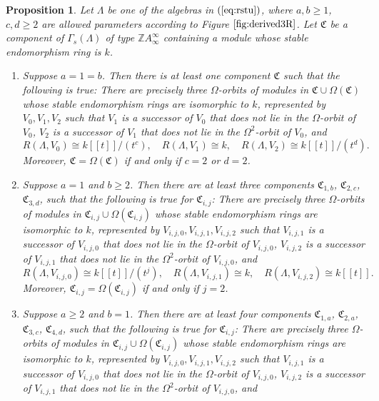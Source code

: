\documentclass{amsart}
\theoremstyle{plain}
\newtheorem{prop}[thm]{Proposition}
\theoremstyle{definition}
\theoremstyle{remark}
\begin{document}
\begin{prop}
\label{prop:derivedexvelez}
Let $\Lambda$ be one of the algebras in $(\ref{eq:rstu})$, where $a,b\ge 1$, $c,d\ge 2$ are allowed parameters according to Figure 
$\ref{fig:derived3R}$. Let $\mathfrak{C}$ be a component of $\Gamma_s(\Lambda)$ of type $\mathbb{Z}A_\infty^\infty$ 
containing a module whose stable endomorphism ring is $k$.
\begin{enumerate}
\item[(i)] Suppose $a=1=b$. Then there is at least one component $\mathfrak{C}$ such that the following is true:
There are precisely three $\Omega$-orbits of modules in $\mathfrak{C}\cup\Omega(\mathfrak{C})$ whose stable endomorphism rings are 
isomorphic to $k$, represented by  $V_0,V_1,V_2$ such that $V_1$ is a successor of $V_0$ that does not lie in the $\Omega$-orbit of $V_0$, 
$V_2$ is a successor of $V_1$ that does not lie in the $\Omega^2$-orbit of $V_0$, and
$$R(\Lambda,V_0)\cong k[[t]]/(t^c), \quad R(\Lambda,V_1)\cong k, \quad R(\Lambda,V_2)\cong k[[t]]/(t^d).$$
Moreover, $\mathfrak{C}=\Omega(\mathfrak{C})$ if and only if $c=2$ or $d=2$.
\item[(ii)] Suppose $a=1$ and $b\ge 2$. Then there are at least three components 
$\mathfrak{C}_{1,b}$, $\mathfrak{C}_{2,c}$, $\mathfrak{C}_{3,d}$,
such that the following is true for $\mathfrak{C}_{i,j}$:
There are precisely three $\Omega$-orbits of modules in $\mathfrak{C}_{i,j}\cup\Omega(\mathfrak{C}_{i,j})$ whose stable endomorphism rings 
are isomorphic to $k$, represented by $V_{i,j,0},V_{i,j,1},V_{i,j,2}$ such that $V_{i,j,1}$ is a successor of $V_{i,j,0}$ that does not lie in the 
$\Omega$-orbit of $V_{i,j,0}$, $V_{i,j,2}$ is a successor of $V_{i,j,1}$ that does not lie in the $\Omega^2$-orbit of $V_{i,j,0}$, and
$$R(\Lambda,V_{i,j,0})\cong k[[t]]/(t^j), \quad R(\Lambda,V_{i,j,1})\cong k, \quad R(\Lambda,V_{i,j,2})\cong k[[t]].$$
Moreover, $\mathfrak{C}_{i,j}=\Omega(\mathfrak{C}_{i,j})$ if and only if $j=2$.
\item[(iii)] Suppose $a\ge 2$ and $b=1$. Then there are at least four components 
$\mathfrak{C}_{1,a}$, $\mathfrak{C}_{2,a}$, $\mathfrak{C}_{3,c}$, $\mathfrak{C}_{4,d}$,
such that the following is true for $\mathfrak{C}_{i,j}$:
There are precisely three $\Omega$-orbits of modules in $\mathfrak{C}_{i,j}\cup\Omega(\mathfrak{C}_{i,j})$ whose stable endomorphism rings 
are isomorphic to $k$, represented by $V_{i,j,0},V_{i,j,1},V_{i,j,2}$ such that $V_{i,j,1}$ is a successor of $V_{i,j,0}$ that does not lie in the 
$\Omega$-orbit of $V_{i,j,0}$, $V_{i,j,2}$ is a successor of $V_{i,j,1}$ that does not lie in the $\Omega^2$-orbit of $V_{i,j,0}$, and

\end{enumerate}
\end{prop}
\end{document}
